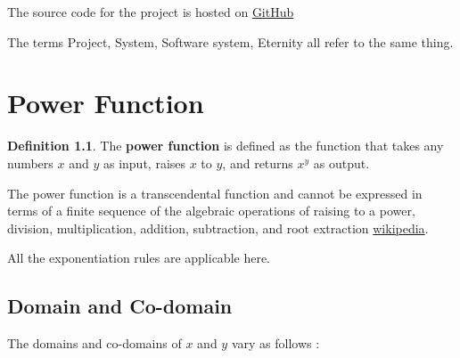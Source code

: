 \documentclass[11pt,a4paper]{report}
\theoremstyle{definition}
\newtheorem{definition}{Definition}[section]
\theoremstyle{remark}
\begin{document}
    \vspace{0.75cm}
    
    The source code for the project is hosted on \href{https://github.com/akhil-sharma/soen6011-eternity.git}{GitHub} 
    
    \vspace{0.75cm}
    
    The terms Project, System, Software system, Eternity all refer to the same thing.
    
    \chapter{Power Function}
    
        \begin{definition}
            The \textbf{power function} is defined as the function that takes any numbers $x$ and $y$ as input, raises $x$ to $y$, and returns $x^y$ as output.
        \end{definition}
    
        The power function is a transcendental function and cannot be expressed in terms of a finite sequence of the algebraic operations of raising to a power, division, multiplication, addition, subtraction, and root extraction \href{https://en.wikipedia.org/wiki/Transcendental_function}{wikipedia}.
        
        All the exponentiation rules are applicable here.
        
        \section{Domain and Co-domain}
        The domains and co-domains of $x$ and $y$ vary as follows \cite{algorithms}:
        
\end{document}
